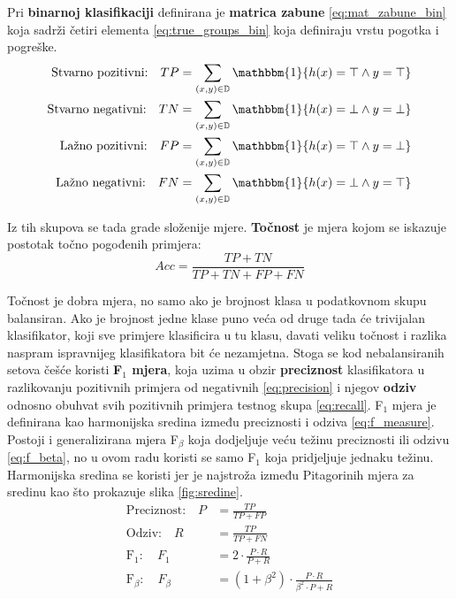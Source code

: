 \documentclass[times, utf8, numeric, diplomski]{fer}
\def\F1{F$_1$}
\begin{document}
Pri \textbf{binarnoj klasifikaciji} definirana je \textbf{matrica zabune} \eqref{eq:mat_zabune_bin} koja sadrži četiri elementa \eqref{eq:true_groups_bin} koja definiraju vrstu pogotka i pogreške.
\begin{align}
\label{eq:true_groups_bin}
\begin{split}
\text{Stvarno pozitivni:} \quad TP &= \sum_{(x,y)\in\mathbb{D}} \mathbbm{1} \{h(x) = \top \wedge y = \top \} \\
\text{Stvarno negativni:} \quad TN &= \sum_{(x,y)\in\mathbb{D}} \mathbbm{1} \{h(x) = \bot \wedge y = \bot \} \\
\text{Lažno pozitivni:}   \quad FP &= \sum_{(x,y)\in\mathbb{D}} \mathbbm{1} \{h(x) = \top \wedge y = \bot \} \\
\text{Lažno negativni:}   \quad FN &= \sum_{(x,y)\in\mathbb{D}} \mathbbm{1} \{h(x) = \bot \wedge y = \top \}
\end{split}
\end{align}

Iz tih skupova se tada grade složenije mjere. \textbf{Točnost} je mjera kojom se iskazuje postotak točno pogođenih primjera:
\begin{equation}
Acc = \frac{TP+TN}{TP+TN+FP+FN}
\end{equation}

Točnost je dobra mjera, no samo ako je brojnost klasa u podatkovnom skupu balansiran. Ako je brojnost jedne klase puno veća od druge tada će trivijalan klasifikator, koji sve primjere klasificira u tu klasu, davati veliku točnost i razlika naspram ispravnijeg klasifikatora bit će nezamjetna. Stoga se kod nebalansiranih setova češće koristi \textbf{\F1 mjera}, koja uzima u obzir \textbf{preciznost} klasifikatora u razlikovanju pozitivnih primjera od negativnih \eqref{eq:precision} i njegov \textbf{odziv} odnosno obuhvat svih pozitivnih primjera testnog skupa \eqref{eq:recall}. \F1 mjera je definirana kao harmonijska sredina između preciznosti i odziva \eqref{eq:f_measure}. Postoji i generalizirana mjera F$_\beta$ koja dodjeljuje veću težinu preciznosti ili odzivu \eqref{eq:f_beta}, no u ovom radu koristi se samo \F1 koja pridjeljuje jednaku težinu. Harmonijska sredina se koristi jer je najstroža između Pitagorinih mjera za sredinu kao što prokazuje slika \ref{fig:sredine}.
\begin{align}
\text{Preciznost:} \quad P &= \frac{TP}{TP+FP} \label{eq:precision} \\
\text{Odziv:} \quad R &= \frac{TP}{TP+FN} \label{eq:recall} \\
\text{F}_1: \quad F_1 &= 2 \cdot \frac{P \cdot R}{P + R} \label{eq:f_measure} \\
\text{F}_\beta: \quad F_\beta &= (1 + \beta^2) \cdot \frac{P \cdot R}{\beta ^2 \cdot P + R} \label{eq:f_beta}
\end{align}
\end{document}
